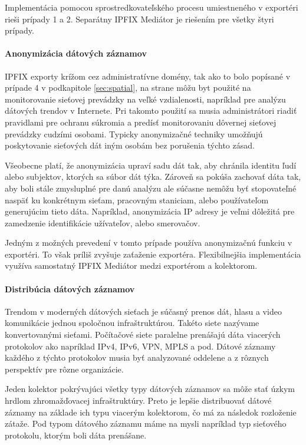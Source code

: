 Implementácia pomocou sprostredkovateľského procesu umiestneného v exportéri rieši prípady 1 a 2. 
Separátny IPFIX Mediátor je riešením pre  všetky štyri prípady.

\paragraph{Anonymizácia dátových záznamov}

IPFIX exporty krížom cez administratívne domény, tak ako to bolo popísané v prípade 4 
v podkapitole \ref{sec:spatial}, na strane \pageref{sec:spatial} môžu 
byt použité na monitorovanie sieťovej prevádzky na veľké vzdialenosti, 
napríklad pre analýzu dátových trendov v Internete. Pri takomto použití sa musia administrátori riadiť
pravidlami pre ochranu súkromia a predísť monitorovaniu dôvernej sieťovej prevádzky cudzími osobami.
Typicky anonymizačné techniky umožňujú poskytovanie sieťových dát iným osobám bez porušenia týchto zásad.

Všeobecne platí, že anonymizácia upraví sadu dát tak, aby chránila identitu ľudí alebo subjektov, 
ktorých sa súbor dát týka. Zároveň sa pokúša zachovať dáta tak, aby boli stále zmysluplné pre danú 
analýzu ale súčasne nemôžu byť stopovateľné naspäť ku konkrétnym sieťam, pracovným staniciam, alebo 
používateľom generujúcim tieto dáta. Napríklad, anonymizácia IP adresy je veľmi dôležitá pre 
zamedzenie identifikácie užívateľov, alebo smerovačov. 

Jedným z možných prevedení v tomto prípade používa anonymizačnú funkciu v exportéri. 
To však príliš zvyšuje zaťaženie exportéra. Flexibilnejšia implementácia využíva samostatný 
IPFIX Mediátor medzi exportérom a kolektorom.

\paragraph{Distribúcia dátových záznamov}

Trendom v moderných dátových sieťach je súčasný prenos dát, hlasu a video komunikácie jednou 
spoločnou infraštruktúrou. Takéto siete nazývame konvertovanými sieťami. 
Počítačové siete paralelne prenášajú dáta viacerých protokolov ako napríklad
IPv4, IPv6, VPN, MPLS a pod. Dátové záznamy každého z týchto protokolov musia byť analyzované 
oddelene a z rôznych perspektív pre rôzne organizácie.

Jeden kolektor pokrývajúci všetky typy dátových záznamov sa môže stať úzkym hrdlom 
zhromažďovacej infraštruktúry. Preto je lepšie distribuovať dátové záznamy na základe ich 
typu viacerým kolektorom, čo má za následok rozloženie zátaže. Pod typom dátového 
záznamu máme na mysli napríklad typ sieťového protokolu, ktorým boli dáta prenášane. 

